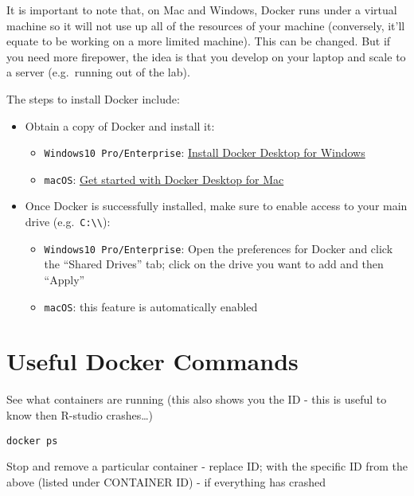 \documentclass[
]{book}
\providecommand{\tightlist}{%
  \setlength{\itemsep}{0pt}\setlength{\parskip}{0pt}}
\begin{document}
It is important to note that, on Mac and Windows, Docker runs under a virtual
machine so it will not use up all of the resources of your machine
(conversely, it'll equate to be working on a more limited machine). This can
be changed. But if you need more firepower, the idea is that you develop on
your laptop and scale to a server (e.g.~running out of the lab).

The steps to install Docker include:

\begin{itemize}
\tightlist
\item
  Obtain a copy of Docker and install it:

  \begin{itemize}
  \tightlist
  \item
    \texttt{Windows10\ Pro/Enterprise}: \href{https://docs.docker.com/docker-for-windows/install/}{Install Docker Desktop for Windows}
  \item
    \texttt{macOS}: \href{https://docs.docker.com/docker-for-mac/}{Get started with Docker Desktop for Mac}
  \end{itemize}
\item
  Once Docker is successfully installed, make sure to enable access to your main drive (e.g.~\texttt{C:\textbackslash{}\textbackslash{}}):

  \begin{itemize}
  \tightlist
  \item
    \texttt{Windows10\ Pro/Enterprise}: Open the preferences for Docker and click the
    ``Shared Drives'' tab; click on the drive you want to add and then ``Apply''
  \item
    \texttt{macOS}: this feature is automatically enabled
  \end{itemize}
\end{itemize}

\hypertarget{useful-docker-commands}{%
\section{Useful Docker Commands}\label{useful-docker-commands}}

See what containers are running (this also shows you the ID - this is useful to know then R-studio crashes\ldots)

\begin{verbatim}
docker ps
\end{verbatim}

Stop and remove a particular container - replace ID; with the specific ID from the above (listed under CONTAINER ID) - if everything has crashed
\end{document}
